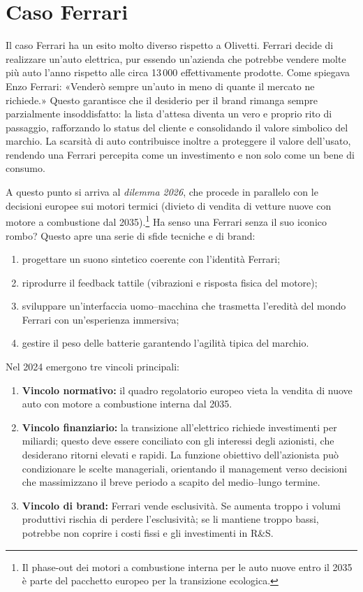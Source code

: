 \documentclass[a4paper,12pt]{article}
\begin{document}
	\section{Caso Ferrari}
	
	Il caso Ferrari ha un esito molto diverso rispetto a Olivetti.%
	Ferrari decide di realizzare un'auto elettrica, pur essendo un'azienda che potrebbe vendere molte più auto l'anno rispetto alle circa 13\,000 effettivamente prodotte.%
	Come spiegava Enzo Ferrari: «Venderò sempre un'auto in meno di quante il mercato ne richiede.»%
	Questo garantisce che il desiderio per il brand rimanga sempre parzialmente insoddisfatto: la lista d'attesa diventa un vero e proprio rito di passaggio, rafforzando lo status del cliente e consolidando il valore simbolico del marchio.%
	La scarsità di auto contribuisce inoltre a proteggere il valore dell'usato, rendendo una Ferrari percepita come un investimento e non solo come un bene di consumo.
	
	A questo punto si arriva al \emph{dilemma 2026}, che procede in parallelo con le decisioni europee sui motori termici (divieto di vendita di vetture nuove con motore a combustione dal 2035).\footnote{Il phase-out dei motori a combustione interna per le auto nuove entro il 2035 è parte del pacchetto europeo per la transizione ecologica. } 
	Ha senso una Ferrari senza il suo iconico rombo?%
	Questo apre una serie di sfide tecniche e di brand:
	\begin{enumerate}
		\item progettare un suono sintetico coerente con l'identità Ferrari;
		\item riprodurre il feedback tattile (vibrazioni e risposta fisica del motore);
		\item sviluppare un'interfaccia uomo–macchina che trasmetta l'eredità del mondo Ferrari con un'esperienza immersiva;
		\item gestire il peso delle batterie garantendo l'agilità tipica del marchio.
	\end{enumerate}
	
	Nel 2024 emergono tre vincoli principali:
	\begin{enumerate}
		\item \textbf{Vincolo normativo:} il quadro regolatorio europeo vieta la vendita di nuove auto con motore a combustione interna dal 2035.
		\item \textbf{Vincolo finanziario:} la transizione all'elettrico richiede investimenti per miliardi; questo deve essere conciliato con gli interessi degli azionisti, che desiderano ritorni elevati e rapidi. La funzione obiettivo dell'azionista può condizionare le scelte manageriali, orientando il management verso decisioni che massimizzano il breve periodo a scapito del medio–lungo termine.
		\item \textbf{Vincolo di brand:} Ferrari vende esclusività. Se aumenta troppo i volumi produttivi rischia di perdere l'esclusività; se li mantiene troppo bassi, potrebbe non coprire i costi fissi e gli investimenti in R\&S.
	\end{enumerate}
	
\end{document}
